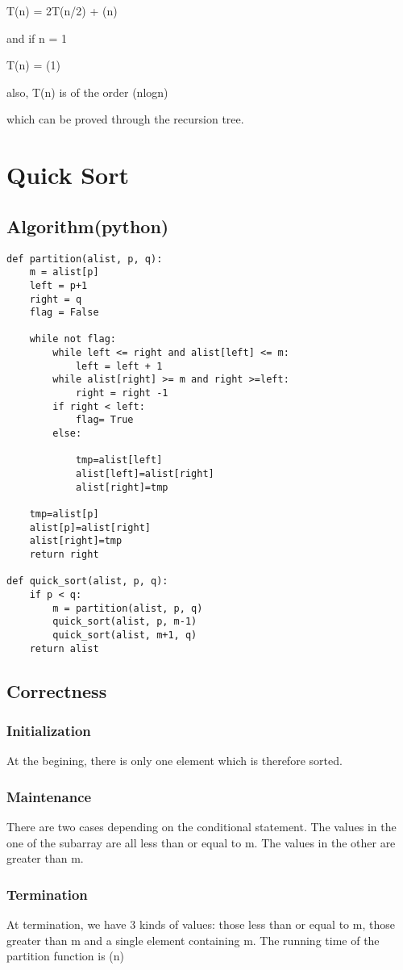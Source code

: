 \documentclass{article}
\begin{document}
T(n) = 2T(n/2) + \theta(n)

and if n = 1

T(n) = \theta(1)

also, T(n) is of the order \theta(nlogn)

which can be proved through the recursion tree.


\section{Quick Sort}
\subsection{Algorithm(python)}
\begin{lstlisting}
def partition(alist, p, q):
    m = alist[p]
    left = p+1
    right = q
    flag = False

    while not flag:
        while left <= right and alist[left] <= m:
            left = left + 1
        while alist[right] >= m and right >=left:
            right = right -1
        if right < left:
            flag= True
        else:
            
            tmp=alist[left]
            alist[left]=alist[right]
            alist[right]=tmp

    tmp=alist[p]
    alist[p]=alist[right]
    alist[right]=tmp
    return right

def quick_sort(alist, p, q):
    if p < q:
        m = partition(alist, p, q)
        quick_sort(alist, p, m-1)
        quick_sort(alist, m+1, q)
    return alist
\end{lstlisting}

\subsection{Correctness}
\subsubsection{Initialization}
At the begining, there is only one element which is therefore sorted.
\subsubsection{Maintenance}
There are two cases depending on the conditional statement. The values in the one of the subarray are all less than or equal to m. The values in the other are greater than m.
\subsubsection{Termination}
At termination, we have 3 kinds of values: those less than or equal to m, those greater than m and a single element containing m. The running time of the partition function is \theta(n)
\end{document}
